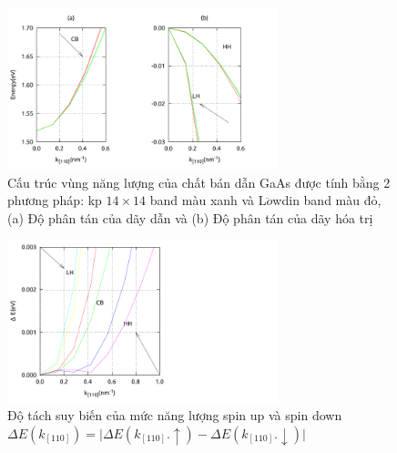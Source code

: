 \begin{figure}[ht]
\centering
\includegraphics[width=0.70\textwidth]{./Figures/comparsion.pdf}
\caption[computer kp 14-band and L$\ddot{o}$wdin GaAs]{Cấu trúc vùng năng lượng của chất bán dẫn GaAs được tính bằng 2  phương pháp: kp $14\times14$ band màu xanh và L$\ddot{o}$wdin band  màu đỏ, (a) Độ phân tán của dãy dẫn và (b) Độ phân tán của dãy hóa trị}
\end{figure}
\begin{figure}[ht]
\raggedleft
\includegraphics[width=0.70\textwidth]{./Figures/comparsion2.pdf}
\caption[so sánh phương pháp kp 14-band GaAs và L$\ddot{o}wdin$]{Độ tách suy biến của mức năng lượng spin up và spin down\\
 $\Delta E(k_{[110]})= \vert\Delta E(k_{[110]}.\uparrow) - \Delta E(k_{[110]}.\downarrow)\vert$}
\end{figure}